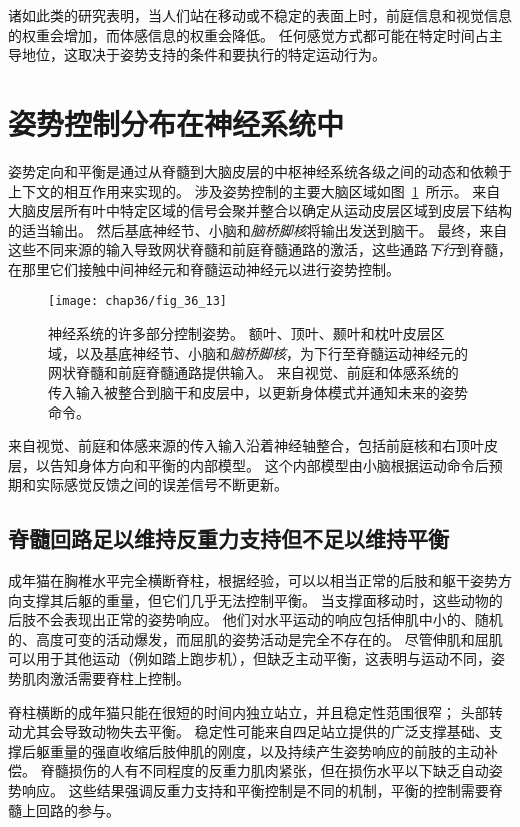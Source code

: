 诸如此类的研究表明，当人们站在移动或不稳定的表面上时，前庭信息和视觉信息的权重会增加，而体感信息的权重会降低。
任何感觉方式都可能在特定时间占主导地位，这取决于姿势支持的条件和要执行的特定运动行为。



\section{姿势控制分布在神经系统中}

姿势定向和平衡是通过从脊髓到大脑皮层的中枢神经系统各级之间的动态和依赖于上下文的相互作用来实现的。
涉及姿势控制的主要大脑区域如图~\ref{fig:36_13}~所示。
来自大脑皮层所有叶中特定区域的信号会聚并整合以确定从运动皮层区域到皮层下结构的适当输出。
然后基底神经节、小脑和\textit{脑桥脚核}将输出发送到脑干。
最终，来自这些不同来源的输入导致网状脊髓和前庭脊髓通路的激活，这些通路\textit{下行}到脊髓，在那里它们接触中间神经元和脊髓运动神经元以进行姿势控制。


\begin{figure}[htbp]
	\centering
	\texttt{[image: chap36/fig\_36\_13]}
	\caption{神经系统的许多部分控制姿势。
		额叶、顶叶、颞叶和枕叶皮层区域，以及基底神经节、小脑和\textit{脑桥脚核}，为下行至脊髓运动神经元的网状脊髓和前庭脊髓通路提供输入。
		来自视觉、前庭和体感系统的传入输入被整合到脑干和皮层中，以更新身体模式并通知未来的姿势命令。}
	\label{fig:36_13}
\end{figure}


来自视觉、前庭和体感来源的传入输入沿着神经轴整合，包括前庭核和右顶叶皮层，以告知身体方向和平衡的内部模型。
这个内部模型由小脑根据运动命令后预期和实际感觉反馈之间的误差信号不断更新。



\subsection{脊髓回路足以维持反重力支持但不足以维持平衡}

成年猫在胸椎水平完全横断脊柱，根据经验，可以以相当正常的后肢和躯干姿势方向支撑其后躯的重量，但它们几乎无法控制平衡。
当支撑面移动时，这些动物的后肢不会表现出正常的姿势响应。
他们对水平运动的响应包括伸肌中小的、随机的、高度可变的活动爆发，而屈肌的姿势活动是完全不存在的。
尽管伸肌和屈肌可以用于其他运动（例如踏上跑步机），但缺乏主动平衡，这表明与运动不同，姿势肌肉激活需要脊柱上控制。


脊柱横断的成年猫只能在很短的时间内独立站立，并且稳定性范围很窄；
头部转动尤其会导致动物失去平衡。
稳定性可能来自四足站立提供的广泛支撑基础、支撑后躯重量的强直收缩后肢伸肌的刚度，以及持续产生姿势响应的前肢的主动补偿。
脊髓损伤的人有不同程度的反重力肌肉紧张，但在损伤水平以下缺乏自动姿势响应。
这些结果强调反重力支持和平衡控制是不同的机制，平衡的控制需要脊髓上回路的参与。




